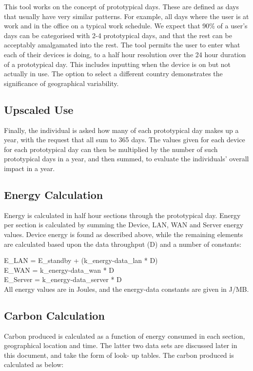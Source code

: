 \documentclass[conference]{IEEEtran}
\begin{document}
This tool works on the concept of prototypical days. These are defined
as days that usually have very similar patterns. For example, all days
where the user is at work and in the office on a typical work
schedule. We expect that 90\% of a user’s days can be categorised with
2-4 prototypical days, and that the rest can be acceptably amalgamated
into the rest. The tool permits the user to enter what each of their
devices is doing, to a half hour resolution over the 24 hour duration
of a prototypical day. This includes inputting when the device is on
but not actually in use.  The option to select a different country
demonstrates the significance of geographical variability.

\subsection{Upscaled Use}

Finally, the individual is asked how many of each prototypical day
makes up a year, with the request that all sum to 365 days. The values
given for each device for each prototypical day can then be multiplied
by the number of such prototypical days in a year, and then summed, to
evaluate the individuals' overall impact in a year.

\subsection{Energy Calculation}

Energy is calculated in half hour sections through the prototypical
day. Energy per section is calculated by summing the Device, LAN, WAN
and Server energy values. Device energy is found as described above,
while the remaining elements are calculated based upon the data
throughput (D) and a number of constants:

E\_LAN = E\_standby + (k\_energy-data\_lan * D)\\
E\_WAN = k\_energy-data\_wan * D\\
E\_Server = k\_energy-data\_server * D\\

All energy values are in Joules, and the energy-data constants are given in J/MB.

\subsection{Carbon Calculation}

Carbon produced is calculated as a function of energy consumed in each
section, geographical location and time. The latter two data sets are
discussed later in this document, and take the form of look- up
tables. The carbon produced is calculated as below:
\end{document}
